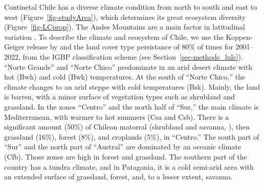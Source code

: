 \documentclass[
  authoryear,
  preprint,
  3p,
  onecolumn]{elsarticle}
\begin{document}
Continetal Chile has a diverse climate condition from north to south and
east to west \citep{Aceituno2021} (Figure~\ref{fig-studyArea}), which
determines its great ecosystem diversity (Figure~\ref{fig-LCprop}). The
Andes Mountains are a main factor in latitudinal variation
\citep{Garreaud2009}. To describe the climate and ecosystem of Chile, we
use the Koppen-Geiger release by \citet{Beck2023} and the land cover
type persistance of 80\% of times for 2001--2022, from the IGBP
classification scheme \citep{Friedl2019} (see
Section~\ref{sec-methods_lulc}). ``Norte Grande'' and ``Norte Chico''
predominate in an arid desert climate with hot (Bwh) and cold (Bwk)
temperatures. At the south of ``Norte Chico,'' the climate changes to an
arid steppe with cold temperatures (Bsk). Mainly, the land is barren,
with a minor surface of vegetation types such as shrubland and
grassland. In the zones ``Centro'' and the north half of ``Sur,'' the
main climate is Mediterranean, with warmer to hot summers (Csa and Csb).
There is a significant amount (50\%) of Chilean matorral (shrubland and
savanna, \citep{Fuentes2021}), then grassland (16\%), forest (8\%), and
croplands (5\%), in ``Centro.'' The south part of ``Sur'' and the north
part of ``Austral'' are dominated by an oceanic climate (Cfb). Those
zones are high in forest and grassland. The southern part of the country
has a tundra climate, and in Patagonia, it is a cold semi-arid area with
an extended surface of grassland, forest, and, to a lesser extent,
savanna.
\end{document}
